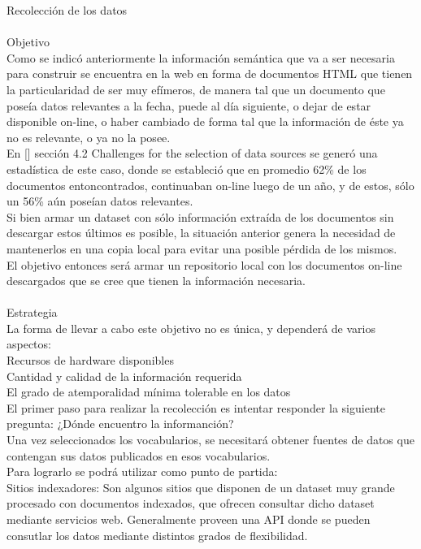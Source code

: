 Recolección de los datos\\
\\
Objetivo\\
Como se indicó anteriormente la información semántica que va a ser necesaria para construir se encuentra en la web en forma de documentos 
HTML que tienen la particularidad de ser muy efímeros, de manera tal que un documento que poseía datos relevantes a la fecha,
puede al día siguiente, o dejar de estar disponible on-line, o haber cambiado de forma tal que la información de éste ya no es 
relevante, o ya no la posee.\\
En [] sección 4.2 Challenges for the selection of data sources se generó una estadística de este caso, donde se estableció que 
en promedio 62\% de los documentos entoncontrados, continuaban on-line luego de un año, y de estos, sólo un 56\% aún poseían 
datos relevantes.\\
Si bien armar un dataset con sólo información extraída de los documentos sin descargar estos últimos es posible, la situación anterior 
genera la necesidad de mantenerlos en una copia local para evitar una posible pérdida de los mismos.\\
El objetivo entonces será armar un repositorio local con los documentos on-line descargados que se cree que tienen la información 
necesaria.\\
\\
Estrategia\\
La forma de llevar a cabo este objetivo no es única, y dependerá de varios aspectos:\\
Recursos de hardware disponibles\\
Cantidad y calidad de la información requerida\\
El grado de atemporalidad mínima tolerable en los datos\\
El primer paso para realizar la recolección es intentar responder la siguiente pregunta: ¿Dónde encuentro la informanción?\\
Una vez seleccionados los vocabularios, se necesitará obtener fuentes de datos que contengan sus datos publicados en esos vocabularios.\\ 
Para lograrlo se podrá utilizar como punto de partida:\\
Sitios indexadores: Son algunos sitios que disponen de un dataset muy grande procesado con documentos indexados, que ofrecen consultar dicho 
dataset mediante servicios web. Generalmente proveen una API donde se pueden consutlar los datos mediante distintos grados de flexibilidad.\\
